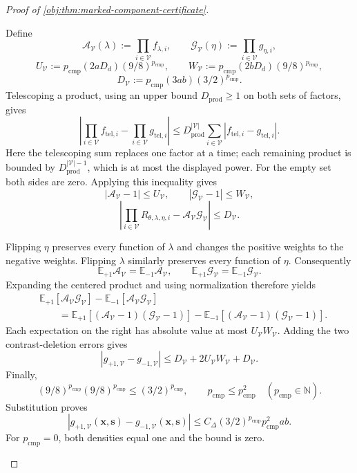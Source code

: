 \documentclass[11pt]{article}
\begin{document}
\begin{proof}[Proof of \cref{obj:thm:marked-component-certificate}]
\begin{enumerate}
Define
\[
\mathcal A_{\mathcal V}(\lambda)
:=\prod_{i\in\mathcal V}f_{\lambda,i},
\qquad
\mathcal G_{\mathcal V}(\eta)
:=\prod_{i\in\mathcal V}g_{\eta,i},
\]
\[
U_{\mathcal V}
:=p_{\mathrm{cmp}}(2aD_d)(9/8)^{p_{\mathrm{cmp}}},
\qquad
W_{\mathcal V}
:=p_{\mathrm{cmp}}(2bD_d)(9/8)^{p_{\mathrm{cmp}}},
\]
\[
D_{\mathcal V}
:=p_{\mathrm{cmp}}(3ab)(3/2)^{p_{\mathrm{cmp}}}.
\]
Telescoping a product, using an upper bound \(D_{\mathrm{prod}}\ge1\) on both sets of factors, gives
\[
\left|
\prod_{i\in\mathcal V}f_{\mathrm{tel},i}
-\prod_{i\in\mathcal V}g_{\mathrm{tel},i}
\right|
\le
D_{\mathrm{prod}}^{|\mathcal V|}
\sum_{i\in\mathcal V}
|f_{\mathrm{tel},i}-g_{\mathrm{tel},i}|.
\]
Here the telescoping sum replaces one factor at a time; each remaining product is bounded by \(D_{\mathrm{prod}}^{|\mathcal V|-1}\), which is at most the displayed power. For the empty set both sides are zero. Applying this inequality gives
\[
|\mathcal A_{\mathcal V}-1|\le U_{\mathcal V},
\qquad
|\mathcal G_{\mathcal V}-1|\le W_{\mathcal V},
\]
\[
\left|
\prod_{i\in\mathcal V}R_{\theta,\lambda,\eta,i}
-\mathcal A_{\mathcal V}\mathcal G_{\mathcal V}
\right|
\le D_{\mathcal V}.
\]

Flipping \(\eta\) preserves every function of \(\lambda\) and changes the positive weights to the negative weights. Flipping \(\lambda\) similarly preserves every function of \(\eta\). Consequently
\[
\mathbb E_{+1}\mathcal A_{\mathcal V}
=\mathbb E_{-1}\mathcal A_{\mathcal V},
\qquad
\mathbb E_{+1}\mathcal G_{\mathcal V}
=\mathbb E_{-1}\mathcal G_{\mathcal V}.
\]
Expanding the centered product and using normalization therefore yields
\[
\begin{aligned}
&\mathbb E_{+1}[\mathcal A_{\mathcal V}\mathcal G_{\mathcal V}]
-\mathbb E_{-1}[\mathcal A_{\mathcal V}\mathcal G_{\mathcal V}]\\
&\qquad=
\mathbb E_{+1}[(\mathcal A_{\mathcal V}-1)(\mathcal G_{\mathcal V}-1)]
-\mathbb E_{-1}[(\mathcal A_{\mathcal V}-1)(\mathcal G_{\mathcal V}-1)].
\end{aligned}
\]
Each expectation on the right has absolute value at most
\(U_{\mathcal V}W_{\mathcal V}\). Adding the two contrast-deletion errors gives
\[
|g_{+1,\mathcal V}-g_{-1,\mathcal V}|
\le D_{\mathcal V}+2U_{\mathcal V}W_{\mathcal V}+D_{\mathcal V}.
\]
Finally,
\[
(9/8)^{p_{\mathrm{cmp}}}(9/8)^{p_{\mathrm{cmp}}}
\le(3/2)^{p_{\mathrm{cmp}}},
\qquad
p_{\mathrm{cmp}}\le p_{\mathrm{cmp}}^2
\quad(p_{\mathrm{cmp}}\in\mathbb N).
\]
Substitution proves
\[
|g_{+1,\mathcal V}(\mathbf x,\mathbf s)
-g_{-1,\mathcal V}(\mathbf x,\mathbf s)|
\le
C_\Delta(3/2)^{p_{\mathrm{cmp}}}
p_{\mathrm{cmp}}^2ab.
\]
For \(p_{\mathrm{cmp}}=0\), both densities equal one and the bound is zero.


\end{enumerate}
\end{proof}
\end{document}

